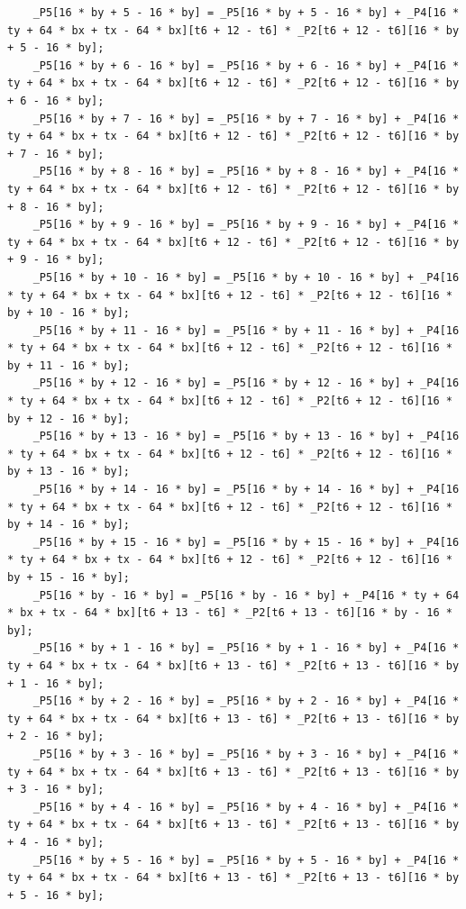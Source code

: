 \documentclass[msthesis,justified,copyright,final,numbers,sort&compress,
gsmodern,amstex,natbib]{uothesis}
\begin{document}
\begin{lstlisting}
    _P5[16 * by + 5 - 16 * by] = _P5[16 * by + 5 - 16 * by] + _P4[16 * ty + 64 * bx + tx - 64 * bx][t6 + 12 - t6] * _P2[t6 + 12 - t6][16 * by + 5 - 16 * by];
    _P5[16 * by + 6 - 16 * by] = _P5[16 * by + 6 - 16 * by] + _P4[16 * ty + 64 * bx + tx - 64 * bx][t6 + 12 - t6] * _P2[t6 + 12 - t6][16 * by + 6 - 16 * by];
    _P5[16 * by + 7 - 16 * by] = _P5[16 * by + 7 - 16 * by] + _P4[16 * ty + 64 * bx + tx - 64 * bx][t6 + 12 - t6] * _P2[t6 + 12 - t6][16 * by + 7 - 16 * by];
    _P5[16 * by + 8 - 16 * by] = _P5[16 * by + 8 - 16 * by] + _P4[16 * ty + 64 * bx + tx - 64 * bx][t6 + 12 - t6] * _P2[t6 + 12 - t6][16 * by + 8 - 16 * by];
    _P5[16 * by + 9 - 16 * by] = _P5[16 * by + 9 - 16 * by] + _P4[16 * ty + 64 * bx + tx - 64 * bx][t6 + 12 - t6] * _P2[t6 + 12 - t6][16 * by + 9 - 16 * by];
    _P5[16 * by + 10 - 16 * by] = _P5[16 * by + 10 - 16 * by] + _P4[16 * ty + 64 * bx + tx - 64 * bx][t6 + 12 - t6] * _P2[t6 + 12 - t6][16 * by + 10 - 16 * by];
    _P5[16 * by + 11 - 16 * by] = _P5[16 * by + 11 - 16 * by] + _P4[16 * ty + 64 * bx + tx - 64 * bx][t6 + 12 - t6] * _P2[t6 + 12 - t6][16 * by + 11 - 16 * by];
    _P5[16 * by + 12 - 16 * by] = _P5[16 * by + 12 - 16 * by] + _P4[16 * ty + 64 * bx + tx - 64 * bx][t6 + 12 - t6] * _P2[t6 + 12 - t6][16 * by + 12 - 16 * by];
    _P5[16 * by + 13 - 16 * by] = _P5[16 * by + 13 - 16 * by] + _P4[16 * ty + 64 * bx + tx - 64 * bx][t6 + 12 - t6] * _P2[t6 + 12 - t6][16 * by + 13 - 16 * by];
    _P5[16 * by + 14 - 16 * by] = _P5[16 * by + 14 - 16 * by] + _P4[16 * ty + 64 * bx + tx - 64 * bx][t6 + 12 - t6] * _P2[t6 + 12 - t6][16 * by + 14 - 16 * by];
    _P5[16 * by + 15 - 16 * by] = _P5[16 * by + 15 - 16 * by] + _P4[16 * ty + 64 * bx + tx - 64 * bx][t6 + 12 - t6] * _P2[t6 + 12 - t6][16 * by + 15 - 16 * by];
    _P5[16 * by - 16 * by] = _P5[16 * by - 16 * by] + _P4[16 * ty + 64 * bx + tx - 64 * bx][t6 + 13 - t6] * _P2[t6 + 13 - t6][16 * by - 16 * by];
    _P5[16 * by + 1 - 16 * by] = _P5[16 * by + 1 - 16 * by] + _P4[16 * ty + 64 * bx + tx - 64 * bx][t6 + 13 - t6] * _P2[t6 + 13 - t6][16 * by + 1 - 16 * by];
    _P5[16 * by + 2 - 16 * by] = _P5[16 * by + 2 - 16 * by] + _P4[16 * ty + 64 * bx + tx - 64 * bx][t6 + 13 - t6] * _P2[t6 + 13 - t6][16 * by + 2 - 16 * by];
    _P5[16 * by + 3 - 16 * by] = _P5[16 * by + 3 - 16 * by] + _P4[16 * ty + 64 * bx + tx - 64 * bx][t6 + 13 - t6] * _P2[t6 + 13 - t6][16 * by + 3 - 16 * by];
    _P5[16 * by + 4 - 16 * by] = _P5[16 * by + 4 - 16 * by] + _P4[16 * ty + 64 * bx + tx - 64 * bx][t6 + 13 - t6] * _P2[t6 + 13 - t6][16 * by + 4 - 16 * by];
    _P5[16 * by + 5 - 16 * by] = _P5[16 * by + 5 - 16 * by] + _P4[16 * ty + 64 * bx + tx - 64 * bx][t6 + 13 - t6] * _P2[t6 + 13 - t6][16 * by + 5 - 16 * by];

\end{lstlisting}
\end{document}
